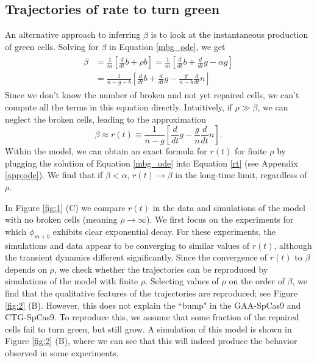 \documentclass{article}
\begin{document}
\subsection{Trajectories of rate to turn green}
An alternative approach to inferring $\beta$ is to look at the instantaneous  production of green cells. Solving for $\beta$ in Equation \ref{mbg_ode}, we get 
\begin{align}
\begin{split}
\beta &= \frac{1}{m}\left[\frac{d}{dt}b +\rho b\right] =  \frac{1}{m}\left[\frac{d}{dt}b +\frac{d}{dt}g - \alpha g\right] \\
&= \frac{1}{n-g-b}\left[\frac{d}{dt}b +\frac{d}{dt}g -\frac{g}{n-b} \frac{d}{dt}n\right]
\end{split}
\end{align}
Since we don't know the number of broken and not yet repaired cells, we can't compute all the terms in this equation directly. Intuitively, if $\rho \gg \beta$, we can neglect the broken cells, leading to the approximation
\begin{equation}\label{rt}
\beta \approx r(t) \equiv \frac{1}{n-g}\left[\frac{d}{dt}g -\frac{g}{n} \frac{d}{dt}n\right]. 
\end{equation}
Within the model, we can obtain an exact formula for $r(t)$ for finite $\rho$ by plugging the solution of Equation \ref{mbg_ode} into Equation \ref{rt} (see Appendix \ref{app:ode}).  We find that if $\beta < \alpha$, $r(t) \to \beta$ in the long-time limit, regardless of $\rho$. 


In Figure \ref{fig:1} (C) we compare $r(t)$ in the data and simulations of the model with no broken cells (meaning $\rho \to \infty$). We first focus on the experiments for which $\phi_{m+b}$ exhibits clear exponential decay. For these experiments, the simulations and data appear to be converging to similar values of $r(t)$, although the transient dynamics different significantly. Since the convergence of $r(t)$ to $\beta$ depends on $\rho$, we check whether the trajectories can be reproduced by simulations of the model with finite $\rho$. Selecting values of $\rho$ on the order of $\beta$, we find that the qualitative features of the trajectories are reproduced; see  Figure \ref{fig:2} (B). However, this does not explain the ``bump" in the GAA-SpCas9 and CTG-SpCas9. To reproduce this, we assume that some fraction of the repaired cells fail to turn green, but still grow. A simulation of this model is shown in Figure \ref{fig:2} (B), where we can see that this will indeed produce the behavior observed in some experiments. 
\end{document}
